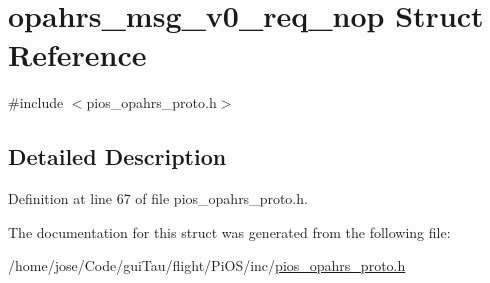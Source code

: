 \hypertarget{structopahrs__msg__v0__req__nop}{\section{opahrs\-\_\-msg\-\_\-v0\-\_\-req\-\_\-nop Struct Reference}
\label{structopahrs__msg__v0__req__nop}
}


{\ttfamily \#include $<$pios\-\_\-opahrs\-\_\-proto.\-h$>$}



\subsection{Detailed Description}


Definition at line 67 of file pios\-\_\-opahrs\-\_\-proto.\-h.



The documentation for this struct was generated from the following file\-:\begin{DoxyCompactItemize}
\item 
/home/jose/\-Code/gui\-Tau/flight/\-Pi\-O\-S/inc/\hyperlink{pios__opahrs__proto_8h}{pios\-\_\-opahrs\-\_\-proto.\-h}\end{DoxyCompactItemize}
